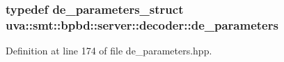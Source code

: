 \subsubsection[{de\+\_\+parameters}]{\setlength{\rightskip}{0pt plus 5cm}typedef {\bf de\+\_\+parameters\+\_\+struct} {\bf uva\+::smt\+::bpbd\+::server\+::decoder\+::de\+\_\+parameters}}\label{namespaceuva_1_1smt_1_1bpbd_1_1server_1_1decoder_aaf4d5faf3a48156401c854d163d4b848}


Definition at line 174 of file de\+\_\+parameters.\+hpp.


